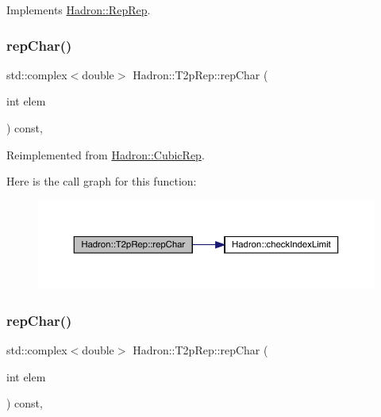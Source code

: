 Implements \mbox{\hyperlink{structHadron_1_1RepRep_ab3213025f6de249f7095892109575fde}{Hadron\+::\+Rep\+Rep}}.

\mbox{\label{structHadron_1_1T2pRep_a42f3c130c87e354a8453c53cdb66e1a5}} 
\subsubsection{\texorpdfstring{repChar()}{repChar()}\hspace{0.1cm}{\footnotesize\ttfamily [1/2]}}
{\footnotesize\ttfamily std\+::complex$<$double$>$ Hadron\+::\+T2p\+Rep\+::rep\+Char (\begin{DoxyParamCaption}\item[{int}]{elem }\end{DoxyParamCaption}) const\hspace{0.3cm}{\ttfamily [inline]}, {\ttfamily [virtual]}}



Reimplemented from \mbox{\hyperlink{structHadron_1_1CubicRep_af45227106e8e715e84b0af69cd3b36f8}{Hadron\+::\+Cubic\+Rep}}.

Here is the call graph for this function\+:
\nopagebreak
\begin{figure}[H]
\begin{center}
\leavevmode
\includegraphics[width=350pt]{d8/d6b/structHadron_1_1T2pRep_a42f3c130c87e354a8453c53cdb66e1a5_cgraph}
\end{center}
\end{figure}
\mbox{\label{structHadron_1_1T2pRep_a42f3c130c87e354a8453c53cdb66e1a5}} 
\subsubsection{\texorpdfstring{repChar()}{repChar()}\hspace{0.1cm}{\footnotesize\ttfamily [2/2]}}
{\footnotesize\ttfamily std\+::complex$<$double$>$ Hadron\+::\+T2p\+Rep\+::rep\+Char (\begin{DoxyParamCaption}\item[{int}]{elem }\end{DoxyParamCaption}) const\hspace{0.3cm}{\ttfamily [inline]}, {\ttfamily [virtual]}}



